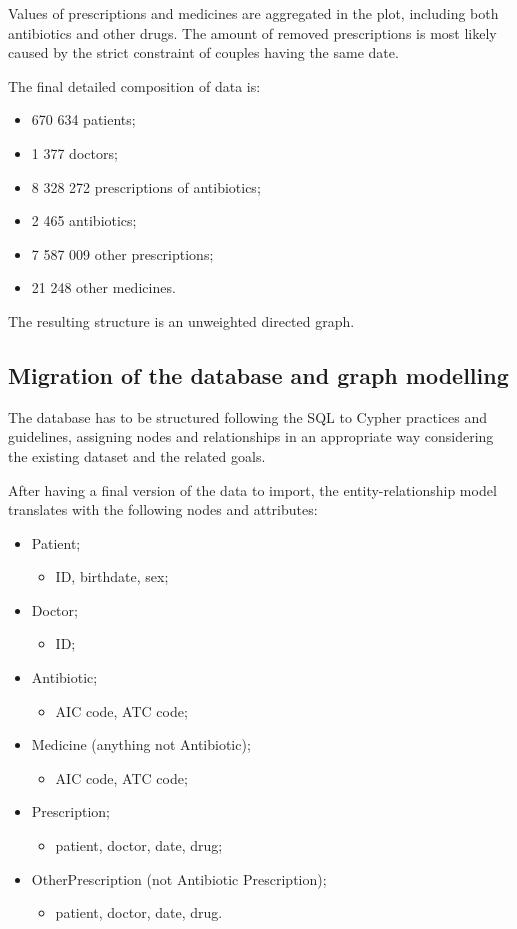 Values of prescriptions and medicines are aggregated in the plot, including both antibiotics and other drugs. The amount of removed prescriptions is most likely caused by the strict constraint of couples having the same date.

The final detailed composition of data is:
\begin{itemize}
	\item 670 634 patients;
	\item 1 377 doctors;
	\item 8 328 272 prescriptions of antibiotics;
	\item 2 465 antibiotics;
	\item 7 587 009 other prescriptions;
	\item 21 248 other medicines.
\end{itemize}

The resulting structure is an unweighted directed graph.

\subsection{Migration of the database and graph modelling}
The database has to be structured following the SQL to Cypher practices and guidelines, assigning nodes and relationships in an appropriate way considering the existing dataset and the related goals.

After having a final version of the data to import, the entity-relationship model translates with the following nodes and attributes:
\begin{itemize}
	\item Patient;
	\begin{itemize}
		\item ID, birthdate, sex;
	\end{itemize}
	\item Doctor;
	\begin{itemize}
		\item ID; 
	\end{itemize}
	\item Antibiotic;
	\begin{itemize}
		\item AIC code, ATC code;
	\end{itemize}
	\item Medicine (anything not Antibiotic);
	\begin{itemize}
		\item AIC code, ATC code;
	\end{itemize}
	\item Prescription;
	\begin{itemize}
		\item patient, doctor, date, drug;
	\end{itemize}
	\item OtherPrescription (not Antibiotic Prescription);
	\begin{itemize}
		\item patient, doctor, date, drug.
	\end{itemize}
\end{itemize}

